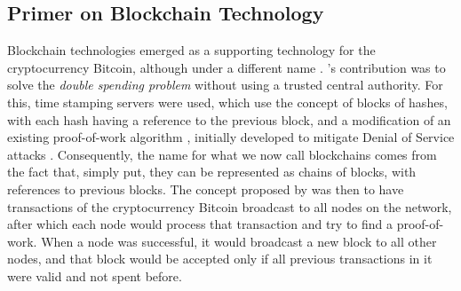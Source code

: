 \subsection{Primer on Blockchain Technology}

Blockchain technologies emerged as a supporting technology for the cryptocurrency Bitcoin, although under a different name \cite{nakamoto_bitcoin:_2008}. \citeauthor{nakamoto_bitcoin:_2008}'s contribution was to solve the \textit{double spending problem} without using a trusted central authority. For this, time stamping servers were used, which use the concept of blocks of hashes, with each hash having a reference to the previous block, and a modification of an existing proof-of-work algorithm \cite{back_hashcash_2002}, initially developed to mitigate Denial of Service attacks \cite[1]{back_hashcash_2002}. Consequently, the name for what we now call blockchains comes from the fact that, simply put, they can be represented as chains of blocks, with references to previous blocks. The concept proposed by \citeauthor{nakamoto_bitcoin:_2008} \cite{nakamoto_bitcoin:_2008} was then to have transactions of the cryptocurrency Bitcoin broadcast to all nodes on the network, after which each node would process that transaction and try to find a proof-of-work. When a node was successful, it would broadcast a new block to all other nodes, and that block would be accepted only if all previous transactions in it were valid and not spent before.

